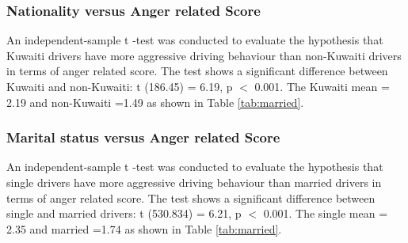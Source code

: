 \documentclass[preprint,12pt,a4paper,authoryear]{elsarticle}
\begin{document}
\subsubsection{Nationality versus Anger related Score}

An independent-sample t -test was conducted to evaluate the hypothesis that Kuwaiti drivers have more aggressive driving behaviour than non-Kuwaiti drivers in terms of anger related score. The test shows a significant difference between Kuwaiti and non-Kuwaiti: t (186.45) = 6.19, p $<$ 0.001. The Kuwaiti mean = 2.19 and non-Kuwaiti =1.49 as shown in Table \ref{tab:married}.

\subsubsection{Marital status versus Anger related Score}

An independent-sample t -test was conducted to evaluate the hypothesis that single drivers have more aggressive driving behaviour than married  drivers in terms of anger related score. The test shows a significant difference between single and married drivers: t (530.834) = 6.21, p $<$ 0.001. The single mean = 2.35 and married =1.74 as shown in Table \ref{tab:married}.

\begin{table}[H]
\centering
\caption{Tests on married and anger}
\label{tab:married}
\end{table}
\end{document}
